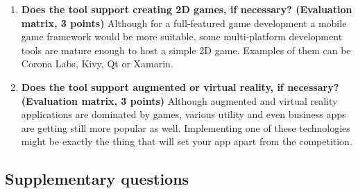 \documentclass[english,master,public,dept460,male,cpdeclaration,oneside]{diploma}
\begin{document}
\begin{enumerate}
	\item \textbf{Does the tool support creating 2D games, if necessary? (Evaluation matrix, 3 points) }
	Although for a full-featured game development a mobile game framework would be more suitable, some multi-platform development tools are mature enough to host a simple 2D game. Examples of them can be Corona Labs, Kivy, Qt or Xamarin.
	
	\item \textbf{Does the tool support augmented or virtual reality, if necessary? (Evaluation matrix, 3 points) }
	Although augmented and virtual reality applications are dominated by games, various utility and even business apps are getting still more popular as well. Implementing one of these technologies might be exactly the thing that will set your app apart from the competition.
\end{enumerate}

\subsection{Supplementary questions}
\end{document}
